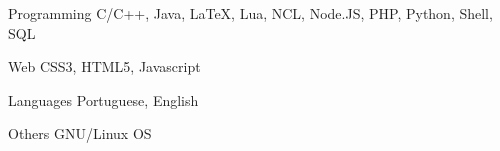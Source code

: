 

\begin{cvskills}

  \cvskill
    {Programming} %
    {C/C++, Java, LaTeX, Lua, NCL, Node.JS, PHP, Python, Shell, SQL} %

  \cvskill
    {Web} %
    {CSS3, HTML5, Javascript} %

  \cvskill
    {Languages} %
    {Portuguese, English} %

  \cvskill
    {Others} %
    {GNU/Linux OS} %

\end{cvskills}
